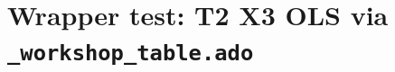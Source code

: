 \documentclass{article}
\begin{document}
\section*{Wrapper test: T2 X3 OLS via \texttt{\_workshop\_table.ado}}


\end{document}
